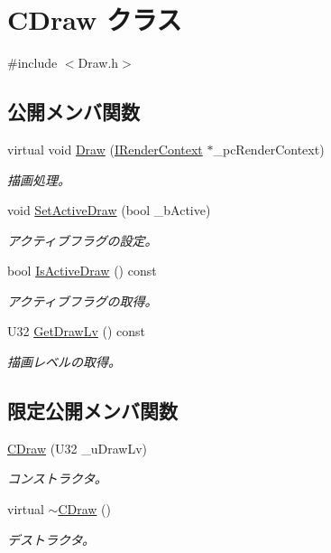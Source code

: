 \hypertarget{class_c_draw}{}\section{C\+Draw クラス}
\label{class_c_draw}


{\ttfamily \#include $<$Draw.\+h$>$}

\subsection*{公開メンバ関数}
\begin{DoxyCompactItemize}
\item 
virtual void \hyperlink{class_c_draw_ad47eba2cc4c42c22054840fd01188113}{Draw} (\hyperlink{class_i_render_context}{I\+Render\+Context} $\ast$\+\_\+pc\+Render\+Context)
\begin{DoxyCompactList}\small\item\em 描画処理。 \end{DoxyCompactList}\item 
void \hyperlink{class_c_draw_a488b15c0d5ab2804ef17041c660c0ee4}{Set\+Active\+Draw} (bool \+\_\+b\+Active)
\begin{DoxyCompactList}\small\item\em アクティブフラグの設定。 \end{DoxyCompactList}\item 
bool \hyperlink{class_c_draw_a03be67979fa5b246e836254ad1e4bacc}{Is\+Active\+Draw} () const 
\begin{DoxyCompactList}\small\item\em アクティブフラグの取得。 \end{DoxyCompactList}\item 
U32 \hyperlink{class_c_draw_af3f2ed5336c01a4c58cab3441859cbba}{Get\+Draw\+Lv} () const 
\begin{DoxyCompactList}\small\item\em 描画レベルの取得。 \end{DoxyCompactList}\end{DoxyCompactItemize}
\subsection*{限定公開メンバ関数}
\begin{DoxyCompactItemize}
\item 
\hyperlink{class_c_draw_afb80462217185decc321ec9c087b5dbf}{C\+Draw} (U32 \+\_\+u\+Draw\+Lv)
\begin{DoxyCompactList}\small\item\em コンストラクタ。 \end{DoxyCompactList}\item 
virtual \hyperlink{class_c_draw_a4eac2e28e3797347574590ab302a1807}{$\sim$\+C\+Draw} ()
\begin{DoxyCompactList}\small\item\em デストラクタ。 \end{DoxyCompactList}\end{DoxyCompactItemize}
